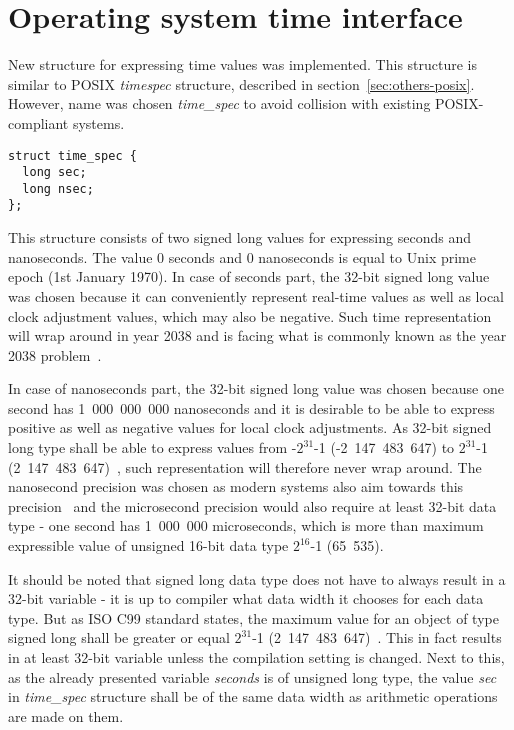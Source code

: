 
\section{Operating system time interface}
New structure for expressing time values was implemented.
This structure is similar to POSIX {\it{timespec}} structure,
described in section~\ref{sec:others-posix}.
However, name was chosen {\it{time\_spec}} to avoid collision with
existing POSIX-compliant systems.
\begin{lstlisting}
struct time_spec {
  long sec;
  long nsec;
};
\end{lstlisting}
This structure consists of two signed long values for expressing seconds and nanoseconds.
The value 0 seconds and 0 nanoseconds is equal to Unix prime epoch (1st January 1970).
In case of seconds part, the 32-bit signed long value was chosen because
it can conveniently
represent real-time values as well as local clock adjustment values, which may also be negative.
Such time representation will wrap around in year 2038 and is facing
what is commonly known as the year 2038 problem~\cite{posix}.

In case of nanoseconds part, the 32-bit signed long value was chosen because
one second has 1~000~000~000 nanoseconds and it is
desirable to be able to express positive as well as negative values for local clock adjustments.
As 32-bit signed long type shall be able to express values from -$2^{31}$-1 (-2~147~483~647)
to $2^{31}$-1 (2~147~483~647)~\cite{c99},
such representation will therefore never wrap around.
The nanosecond precision was chosen as modern systems also aim towards this
precision~\cite{posix,ntp-precision} and
the microsecond precision would also require at least 32-bit data type -
one second has 1~000~000 microseconds, which is more than maximum expressible value of unsigned 16-bit
data type $2^{16}$-1 (65~535).

It should be noted that signed long data type does not have to always result in a 32-bit variable -
it is up to compiler what data width it chooses for each data type.
But as ISO C99 standard states, the maximum value for an object of type signed long
shall be greater or equal $2^{31}$-1 (2~147~483~647)~\cite{c99}.
This in fact results in at least 32-bit variable unless the compilation setting is changed.
Next to this, as the already presented variable {\it{seconds}} is of unsigned long type,
the value {\it{sec}} in {\it{time\_spec}} structure %
shall be of the same data width as arithmetic operations are made on them.

